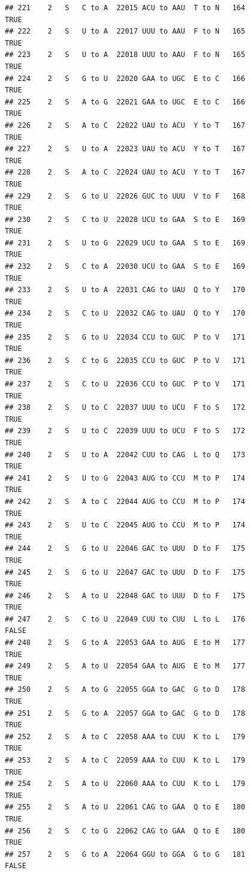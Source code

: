 \documentclass[
  12pt,
]{article}
\begin{document}
\begin{verbatim}
## 221    2   S   C to A  22015 ACU to AAU  T to N   164           TRUE
## 222    2   S   U to A  22017 UUU to AAU  F to N   165           TRUE
## 223    2   S   U to A  22018 UUU to AAU  F to N   165           TRUE
## 224    2   S   G to U  22020 GAA to UGC  E to C   166           TRUE
## 225    2   S   A to G  22021 GAA to UGC  E to C   166           TRUE
## 226    2   S   A to C  22022 UAU to ACU  Y to T   167           TRUE
## 227    2   S   U to A  22023 UAU to ACU  Y to T   167           TRUE
## 228    2   S   A to C  22024 UAU to ACU  Y to T   167           TRUE
## 229    2   S   G to U  22026 GUC to UUU  V to F   168           TRUE
## 230    2   S   C to U  22028 UCU to GAA  S to E   169           TRUE
## 231    2   S   U to G  22029 UCU to GAA  S to E   169           TRUE
## 232    2   S   C to A  22030 UCU to GAA  S to E   169           TRUE
## 233    2   S   U to A  22031 CAG to UAU  Q to Y   170           TRUE
## 234    2   S   C to U  22032 CAG to UAU  Q to Y   170           TRUE
## 235    2   S   G to U  22034 CCU to GUC  P to V   171           TRUE
## 236    2   S   C to G  22035 CCU to GUC  P to V   171           TRUE
## 237    2   S   C to U  22036 CCU to GUC  P to V   171           TRUE
## 238    2   S   U to C  22037 UUU to UCU  F to S   172           TRUE
## 239    2   S   U to C  22039 UUU to UCU  F to S   172           TRUE
## 240    2   S   U to A  22042 CUU to CAG  L to Q   173           TRUE
## 241    2   S   U to G  22043 AUG to CCU  M to P   174           TRUE
## 242    2   S   A to C  22044 AUG to CCU  M to P   174           TRUE
## 243    2   S   U to C  22045 AUG to CCU  M to P   174           TRUE
## 244    2   S   G to U  22046 GAC to UUU  D to F   175           TRUE
## 245    2   S   G to U  22047 GAC to UUU  D to F   175           TRUE
## 246    2   S   A to U  22048 GAC to UUU  D to F   175           TRUE
## 247    2   S   C to U  22049 CUU to CUU  L to L   176          FALSE
## 248    2   S   G to A  22053 GAA to AUG  E to M   177           TRUE
## 249    2   S   A to U  22054 GAA to AUG  E to M   177           TRUE
## 250    2   S   A to G  22055 GGA to GAC  G to D   178           TRUE
## 251    2   S   G to A  22057 GGA to GAC  G to D   178           TRUE
## 252    2   S   A to C  22058 AAA to CUU  K to L   179           TRUE
## 253    2   S   A to C  22059 AAA to CUU  K to L   179           TRUE
## 254    2   S   A to U  22060 AAA to CUU  K to L   179           TRUE
## 255    2   S   A to U  22061 CAG to GAA  Q to E   180           TRUE
## 256    2   S   C to G  22062 CAG to GAA  Q to E   180           TRUE
## 257    2   S   G to A  22064 GGU to GGA  G to G   181          FALSE

\end{verbatim}
\end{document}
